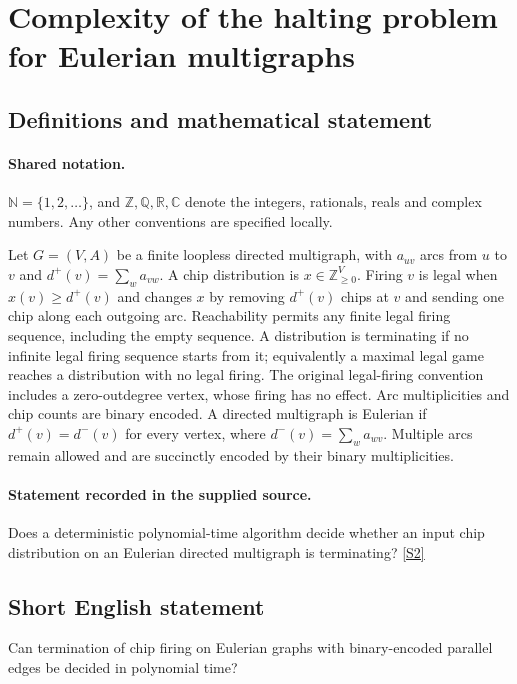 \documentclass[11pt]{article}
\newcommand{\sref}[2]{\hyperlink{source:#1:#2}{[S#2]}}
\begin{document}
\section{Complexity of the halting problem for Eulerian multigraphs}\label{statement}

\subsection{Definitions and mathematical statement}

\paragraph{Shared notation.}$\mathbb N=\{1,2,\ldots\}$, and $\mathbb Z,\mathbb Q,\mathbb R,\mathbb C$ denote the integers, rationals, reals and complex numbers. Any other conventions are specified locally.


Let $G=(V,A)$ be a finite loopless directed multigraph, with $a_{uv}$ arcs from $u$ to $v$ and $d^+(v)=\sum_w a_{vw}$. A chip distribution is $x\in\mathbb Z_{\ge0}^{V}$. Firing $v$ is legal when $x(v)\ge d^+(v)$ and changes $x$ by removing $d^+(v)$ chips at $v$ and sending one chip along each outgoing arc. Reachability permits any finite legal firing sequence, including the empty sequence. A distribution is terminating if no infinite legal firing sequence starts from it; equivalently a maximal legal game reaches a distribution with no legal firing. The original legal-firing convention includes a zero-outdegree vertex, whose firing has no effect. Arc multiplicities and chip counts are binary encoded. A directed multigraph is Eulerian if $d^+(v)=d^-(v)$ for every vertex, where $d^-(v)=\sum_w a_{wv}$. Multiple arcs remain allowed and are succinctly encoded by their binary multiplicities.
\paragraph{Statement recorded in the supplied source.}
Does a deterministic polynomial-time algorithm decide whether an input chip distribution on an Eulerian directed multigraph is terminating? \sref{statement}{2}
\subsection{Short English statement}
Can termination of chip firing on Eulerian graphs with binary-encoded parallel edges be decided in polynomial time?
\end{document}
